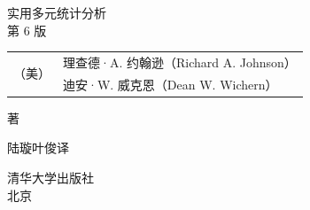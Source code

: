 \clearpage
\thispagestyle{empty}
\begin{center}
\vspace*{2.6cm}

{\setlength{\fboxsep}{6pt}%
 \colorbox{black!55}{\color{white}\heiti{} 实用多元统计分析}}\\[10pt]

{\setlength{\fboxsep}{3pt}%
 \colorbox{black!55}{\color{white}\heiti{} 第 6 版}}

\vspace{14pt}

{\heiti
\begin{tabular}{@{}r@{}l@{}}
\multirow{2}{*}{（美）} & 理查德·A. 约翰逊（Richard A. Johnson）\\
                        & 迪安·W. 威克恩（Dean W. Wichern）
\end{tabular}\hspace{0.5em}著}

\vspace{2.2cm}

{ 陆璇\quad 叶俊\quad 译}

\vfill

{\heiti{} 清华大学出版社}\\[4pt]
{ 北\quad 京}

\end{center}

